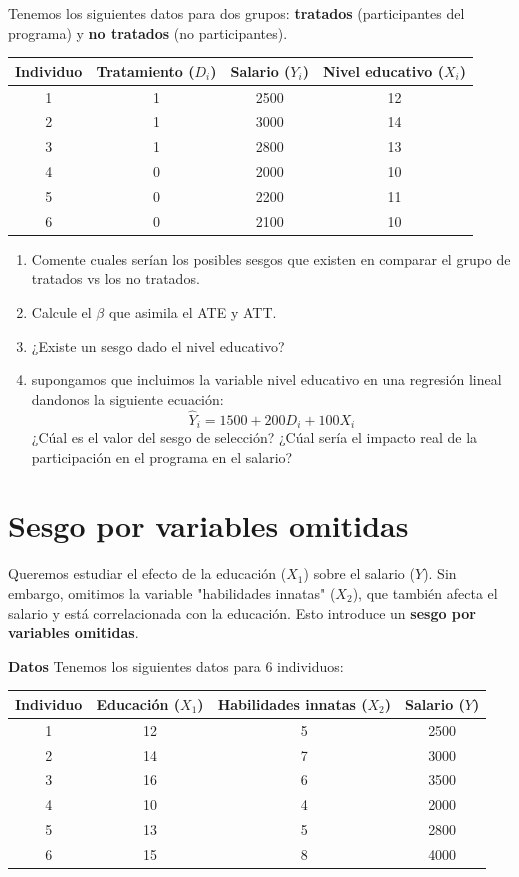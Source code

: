 \documentclass[10pt,a4paper]{article}
\begin{document}
Tenemos los siguientes datos para dos grupos: \textbf{tratados} (participantes del programa) y \textbf{no tratados} (no participantes).

\begin{center}
\begin{tabular}{|c|c|c|c|}
\hline
Individuo & Tratamiento (\( D_i \)) & Salario (\( Y_i \)) & Nivel educativo (\( X_i \)) \\
\hline
1 & 1 & 2500 & 12 \\
2 & 1 & 3000 & 14 \\
3 & 1 & 2800 & 13 \\
4 & 0 & 2000 & 10 \\
5 & 0 & 2200 & 11 \\
6 & 0 & 2100 & 10 \\
\hline
\end{tabular}
\end{center}

\begin{enumerate}
    \item Comente cuales serían los posibles sesgos que existen en comparar el grupo de tratados vs los no tratados.

    \item Calcule el $\beta$ que asimila el ATE y ATT. 

    \item ¿Existe un sesgo dado el nivel educativo?

    \item supongamos que incluimos la variable nivel educativo en una regresión lineal dandonos la siguiente ecuación: 
    $$\hat{Y}_i = 1500+200D_i + 100X_i$$
    ¿Cúal es el valor del sesgo de selección? ¿Cúal sería el impacto real de la participación en el programa en el salario?
\end{enumerate}



\section{Sesgo por variables omitidas}
Queremos estudiar el efecto de la educación (\( X_1 \)) sobre el salario (\( Y \)). Sin embargo, omitimos la variable "habilidades innatas" (\( X_2 \)), que también afecta el salario y está correlacionada con la educación. Esto introduce un \textbf{sesgo por variables omitidas}.

\textbf{Datos}
Tenemos los siguientes datos para 6 individuos:

\begin{center}
\begin{tabular}{|c|c|c|c|}
\hline
Individuo & Educación (\( X_1 \)) & Habilidades innatas (\( X_2 \)) & Salario (\( Y \)) \\
\hline
1 & 12 & 5 & 2500 \\
2 & 14 & 7 & 3000 \\
3 & 16 & 6 & 3500 \\
4 & 10 & 4 & 2000 \\
5 & 13 & 5 & 2800 \\
6 & 15 & 8 & 4000 \\
\hline
\end{tabular}
\end{center}
\end{document}
